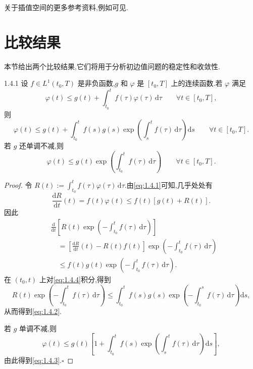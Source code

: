关于插值空间的更多参考资料,例如可见.

\section{比较结果}\label{sec:1.4}

本节给出两个比较结果,它们将用于分析初边值问题的稳定性和收敛性.

\begin{lemma}[Gronwall 引理]{1.4.1}
设 \(f\in L^1(t_0,T)\) 是非负函数,\(g\) 和 \(\varphi\) 是 \([t_0,T]\) 上的连续函数.若 \(\varphi\) 满足
\begin{equation}\label{eq:1.4.1}
  \varphi(t)\le g(t)+\int_{t_0}^t f(\tau)\varphi(\tau)\,\mathrm d\tau
  \qquad \forall t\in[t_0,T],
\end{equation}
则
\begin{equation}\label{eq:1.4.2}
  \varphi(t)\le g(t)+
  \int_{t_0}^t f(s)g(s)\exp\!\left(\int_s^t f(\tau)\,\mathrm d\tau\right)\mathrm ds
  \qquad \forall t\in[t_0,T].
\end{equation}
若 \(g\) 还单调不减,则
\begin{equation}\label{eq:1.4.3}
  \varphi(t)\le g(t)\exp\!\left(\int_{t_0}^t f(\tau)\,\mathrm d\tau\right)
  \qquad \forall t\in[t_0,T].
\end{equation}
\end{lemma}

\begin{proof}
令 \(R(t):=\int_{t_0}^t f(\tau)\varphi(\tau)\,\mathrm d\tau\).由\eqref{eq:1.4.1}可知,几乎处处有
\[
  \frac{\mathrm dR}{\mathrm dt}(t)=f(t)\varphi(t)\le f(t)[g(t)+R(t)].
\]
因此
\begin{equation}\label{eq:1.4.4}
  \begin{aligned}
    &\frac{\mathrm d}{\mathrm dt}
      \left[R(t)\exp\!\left(-\int_{t_0}^t f(\tau)\,\mathrm d\tau\right)\right]\\
    &\quad=\left[\frac{\mathrm dR}{\mathrm dt}(t)-R(t)f(t)\right]
       \exp\!\left(-\int_{t_0}^t f(\tau)\,\mathrm d\tau\right)\\
    &\quad\le f(t)g(t)\exp\!\left(-\int_{t_0}^t f(\tau)\,\mathrm d\tau\right).
  \end{aligned}
\end{equation}
在 \((t_0,t)\) 上对\eqref{eq:1.4.4}积分,得到
\[
  R(t)\exp\!\left(-\int_{t_0}^t f(\tau)\,\mathrm d\tau\right)
  \le\int_{t_0}^t f(s)g(s)\exp\!\left(-\int_{t_0}^s f(\tau)\,\mathrm d\tau\right)\mathrm ds,
\]
从而得到\eqref{eq:1.4.2}.

若 \(g\) 单调不减,则
\[
  \varphi(t)\le g(t)\left[1+
  \int_{t_0}^t f(s)\exp\!\left(\int_s^t f(\tau)\,\mathrm d\tau\right)\mathrm ds\right],
\]
由此得到\eqref{eq:1.4.3}.\hfill\(\square\)
\end{proof}

